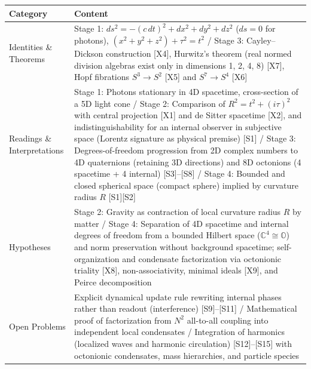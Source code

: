 \documentclass[
  a4paper,
]{article}
\newcounter{none} %
\begin{document}
{\def\LTcaptype{none} %
\begin{longtable}[]{@{}
  >{\raggedright\arraybackslash}p{}
  >{\raggedright\arraybackslash}p{}@{}}
\toprule\noalign{}
\begin{minipage}[b]{\linewidth}\raggedright
Category
\end{minipage} & \begin{minipage}[b]{\linewidth}\raggedright
Content
\end{minipage} \\
\midrule\noalign{}
\endhead
\bottomrule\noalign{}
\endlastfoot
Identities \& Theorems & Stage 1:
\(ds^2 = -(c\,dt)^2 + dx^2 + dy^2 + dz^2\) (\(ds=0\) for photons),
\((x^2+y^2+z^2)+\tau^2=t^2\) / Stage 3: Cayley--Dickson construction
{[}X4{]}, Hurwitz's theorem (real normed division algebras exist only in
dimensions 1, 2, 4, 8) {[}X7{]}, Hopf fibrations \(S^3 \to S^2\)
{[}X5{]} and \(S^7 \to S^4\) {[}X6{]} \\
Readings \& Interpretations & Stage 1: Photons stationary in 4D
spacetime, cross-section of a 5D light cone / Stage 2: Comparison of
\(R^2=t^2+(i\tau)^2\) with central projection {[}X1{]} and de Sitter
spacetime {[}X2{]}, and indistinguishability for an internal observer in
subjective space (Lorentz signature as physical premise) {[}S1{]} /
Stage 3: Degrees-of-freedom progression from 2D complex numbers to 4D
quaternions (retaining 3D directions) and 8D octonions (4 spacetime + 4
internal) {[}S3{]}--{[}S8{]} / Stage 4: Bounded and closed spherical
space (compact sphere) implied by curvature radius \(R\)
{[}S1{]}{[}S2{]} \\
Hypotheses & Stage 2: Gravity as contraction of local curvature radius
\(R\) by matter / Stage 4: Separation of 4D spacetime and internal
degrees of freedom from a bounded Hilbert space
(\(\mathbb{C}^4 \cong \mathbb{O}\)) and norm preservation without
background spacetime; self-organization and condensate factorization via
octonionic triality {[}X8{]}, non-associativity, minimal ideals
{[}X9{]}, and Peirce decomposition \\
Open Problems & Explicit dynamical update rule rewriting internal phases
rather than readout (interference) {[}S9{]}--{[}S11{]} / Mathematical
proof of factorization from \(N^2\) all-to-all coupling into independent
local condensates / Integration of harmonics (localized waves and
harmonic circulation) {[}S12{]}--{[}S15{]} with octonionic condensates,
mass hierarchies, and particle species \\
\end{longtable}
}
\end{document}
